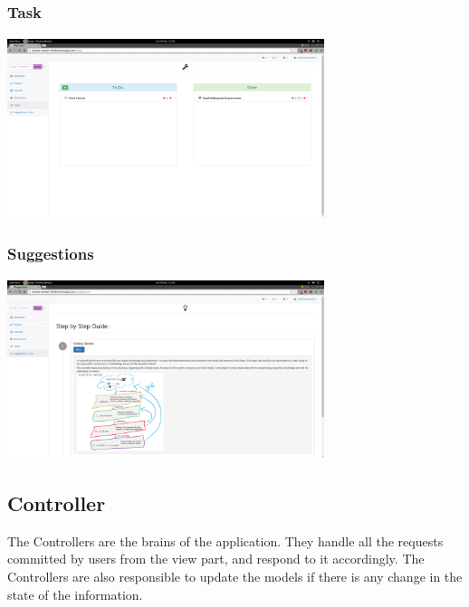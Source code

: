 \subsubsection{Task}

\begin{center}
\includegraphics[height=200px, width=350px]{./img/dsgn_img/task.png}
	
\end{center}

\subsubsection{Suggestions}

\begin{center}
\includegraphics[height=200px, width=350px]{./img/dsgn_img/suggestions.png}
	
\end{center}

\subsection{Controller}
The Controllers are the brains of the application. They handle all the requests committed by users from the view part, and respond to it accordingly.
The Controllers are also responsible to update the models if there is any change in the state of the information.